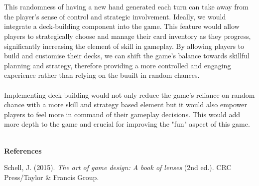 \documentclass[a4paper]{article}
\begin{document}
\\\\
This randomness of having a new hand generated each turn can take away from the player's sense of control and strategic involvement. Ideally, we would integrate a deck-building component into the game. This feature would allow players to strategically choose and manage their card inventory as they progress, significantly increasing the element of skill in gameplay. By allowing players to build and customise their decks, we can shift the game's balance towards skillful planning and strategy, therefore providing a more controlled and engaging experience rather than relying on the buuilt in random chances.
\\\\
Implementing deck-building would not only reduce the game's reliance on random chance with a more skill and strategy based element but it would also empower players to feel more in command of their gameplay decisions. This would add more depth to the game and crucial for improving the "fun" aspect of this game.
\\\\
\begin{center}
    {\large \textbf{References}}
\end{center}
\vspace{3em} 
\noindent Schell, J. (2015). \textit{The art of game design: A book of lenses} (2nd ed.). CRC Press/Taylor \& Francis Group.
\end{document}
